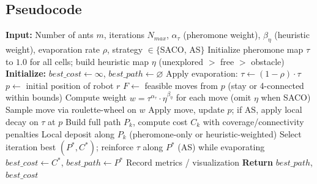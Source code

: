 \subsection{Pseudocode}

\begin{algorithm}[H]
\caption{Ant Colony Optimization for Multi-Robot Path Planning}
\begin{algorithmic}[1]
\State \textbf{Input:} Number of ants $m$, iterations $N_{max}$, $\alpha_{\tau}$ (pheromone weight), $\beta_{\eta}$ (heuristic weight), evaporation rate $\rho$, strategy $\in\{$SACO, AS$\}$
\State Initialize pheromone map $\tau$ to $1.0$ for all cells; build heuristic map $\eta$ (unexplored $>$ free $>$ obstacle)
\State \textbf{Initialize:} $best\_cost \gets \infty$, $best\_path \gets \varnothing$
    \State Apply evaporation: $\tau \gets (1-\rho)\cdot \tau$
            \State $p \gets$ initial position of robot $r$
                \State $F \gets$ feasible moves from $p$ (stay or 4-connected within bounds)
                \State Compute weight $w = \tau^{\alpha_{\tau}} \cdot \eta^{\beta_{\eta}}$ for each move (omit $\eta$ when SACO)
                \State Sample move via roulette-wheel on $w$
                \State Apply move, update $p$; if AS, apply local decay on $\tau$ at $p$
            \EndFor
        \EndFor
        \State Build full path $P_k$, compute cost $C_k$ with coverage/connectivity penalties
        \State Local deposit along $P_k$ (pheromone-only or heuristic-weighted)
    \EndFor
    \State Select iteration best $(P^*, C^*)$; reinforce $\tau$ along $P^*$ (AS) while evaporating
     \State $best\_cost \gets C^*$, $best\_path \gets P^*$ \EndIf
    \State Record metrics / visualization
\EndFor
\State \textbf{Return} $best\_path$, $best\_cost$
\end{algorithmic}
\end{algorithm}

